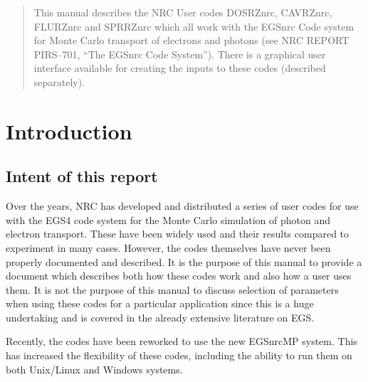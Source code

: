 \documentclass[12pt,twoside]{article}  %
\newcommand{\note}[1]{\mbox{}\\ \noindent \rule{16cm}{0.5mm} \\
{\em #1} \\ \noindent \rule{16cm}{0.5mm}\\
\typeout{******note: #1 *****}
}
\begin{document}

\setlength{\baselineskip}{0.5cm}
\newpage

\pagestyle{fancy}
\setcounter{page}{1}


\begin{abstract}
\label{abstract}
This manual describes the NRC User codes DOSRZnrc, CAVRZnrc, FLURZnrc and
SPRRZnrc which all work with the EGSnrc Code system for Monte Carlo
transport of electrons and photons (see NRC REPORT PIRS--701, ``The EGSnrc
Code System''). There is a graphical user interface available for creating
the inputs to these codes (described separately).

\end{abstract}


\setlength{\baselineskip}{0.1cm}

\tableofcontents

\listoftables
\listoffigures

\setlength{\baselineskip}{0.5cm}

\newpage

\renewcommand{\leftmark}{{INTRODUCTION}}
\section{Introduction}
\subsection{Intent of this report}

Over the years, NRC has developed and distributed a series of user codes
for use with the EGS4 code system for the Monte Carlo simulation of photon
and electron transport.  These have been widely used and their results
compared to experiment in many cases.  However, the codes themselves have
never been properly documented and described. It is the purpose of this
manual to provide a document which describes
both how these codes work and also how a user uses them.  It is not the
purpose of this manual to discuss selection of parameters when using these
codes for a particular application since this is a huge undertaking and is
covered in the already extensive literature on EGS.

Recently, the codes
have been reworked to use the new EGSnrcMP system\cite{Ka03}. This
has increased the flexibility of these codes, including the ability
to run them on both Unix/Linux and Windows systems.
\end{document}
